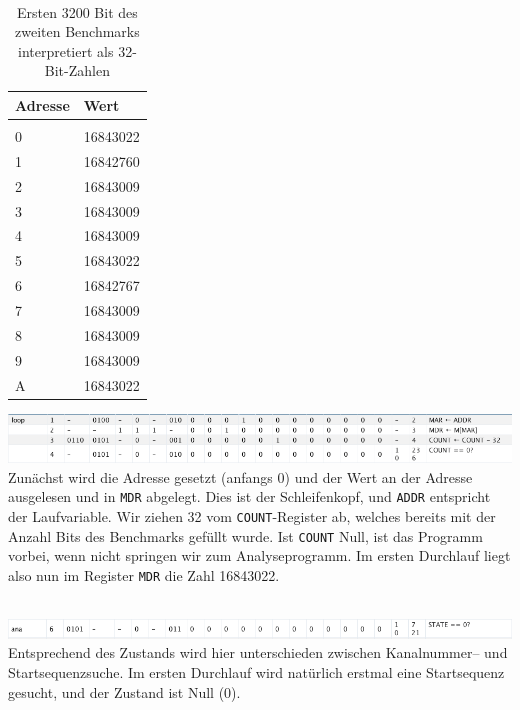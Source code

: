 \documentclass[12pt,titlepage]{article}
\begin{document}
\leavevmode \\

\begin{table}[h!]
    \begin{tabular}{l|l}
    Adresse & Wert            \\
    \hline                    \\
    0     & 16843022  \\
    1     & 16842760  \\
    2     & 16843009  \\
    3     & 16843009  \\
    4     & 16843009  \\
    5     & 16843022  \\
    6     & 16842767  \\
    7     & 16843009  \\
    8     & 16843009  \\
    9     & 16843009  \\
    A     & 16843022  \\
    \end{tabular}
    \caption{Ersten 3200 Bit des zweiten Benchmarks interpretiert als 32-Bit-Zahlen}
\end{table}

\includegraphics[width=16cm]{listing/row1-4.png}
\leavevmode \\

Zunächst wird die Adresse gesetzt (anfangs 0) und der Wert an der Adresse ausgelesen und in \texttt{MDR} abgelegt.
Dies ist der Schleifenkopf, und \texttt{ADDR} entspricht der Laufvariable.
Wir ziehen 32 vom \texttt{COUNT}-Register ab, welches bereits mit der Anzahl Bits des Benchmarks gefüllt wurde.
Ist \texttt{COUNT} Null, ist das Programm vorbei, wenn nicht springen wir zum Analyseprogramm.
Im ersten Durchlauf liegt also nun im Register \texttt{MDR} die Zahl 16843022.

\leavevmode \\
\includegraphics[width=16cm]{listing/row6.png}
\leavevmode \\

Entsprechend des Zustands wird hier unterschieden zwischen Kanalnummer– und Startsequenzsuche. Im ersten Durchlauf
wird natürlich erstmal eine Startsequenz gesucht, und der Zustand ist Null (0).
\end{document}
